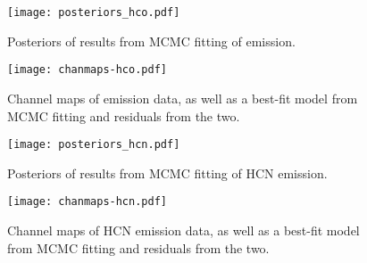 




\begin{figure}[htp]
  \hspace*{\fill}%
  \texttt{[image: posteriors\_hco.pdf]}\hfill%
  \hspace*{\fill}%
  \caption{Posteriors of results from MCMC fitting of \hco emission.}
  \label{fig:hco_posteriors}
\end{figure}



\begin{figure}[htp]
  \hspace*{\fill}%
  \texttt{[image: chanmaps-hco.pdf]}\hfill%
  \hspace*{\fill}%
  \caption{Channel maps of \hco emission data, as well as a best-fit model from MCMC fitting and residuals from the two.}
  \label{fig:hco_chanmaps}
\end{figure}




\begin{figure}[htp]
  \hspace*{\fill}%
  \texttt{[image: posteriors\_hcn.pdf]}\hfill%
  \hspace*{\fill}%
  \caption{Posteriors of results from MCMC fitting of HCN emission.}
  \label{fig:hcn_posteriors}
\end{figure}



\begin{figure}[htp]
  \hspace*{\fill}%
  \texttt{[image: chanmaps-hcn.pdf]}\hfill%
  \hspace*{\fill}%
  \caption{Channel maps of HCN emission data, as well as a best-fit model from MCMC fitting and residuals from the two.}
  \label{fig:hcn_chanmaps}
\end{figure}



